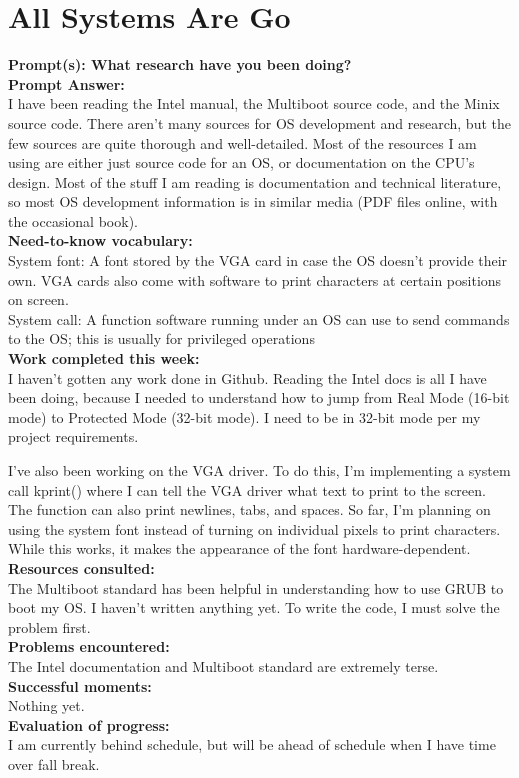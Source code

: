 \documentclass[11pt]{article}
\begin{document}
\section{All Systems Are Go}
\textbf{Prompt(s): What research have you been doing?}\\
\textbf{Prompt Answer:}\\
I have been reading the Intel manual, the Multiboot source code, and the Minix source code. There aren't many sources for OS development and research, but the few sources are quite thorough and well-detailed. Most of the resources I am using are either just source code for an OS, or documentation on the CPU's design. Most of the stuff I am reading is documentation and technical literature, so most OS development information is in similar media (PDF files online, with the occasional book).\\
\textbf{Need-to-know vocabulary:}\\
System font: A font stored by the VGA card in case the OS doesn't provide their own. VGA cards also come with software to print characters at certain positions on screen.\\
System call: A function software running under an OS can use to send commands to the OS; this is usually for privileged operations\\
\textbf{Work completed this week:}\\
I haven't gotten any work done in Github. Reading the Intel docs is all I have been doing, because I needed to understand how to jump from Real Mode (16-bit mode) to Protected Mode (32-bit mode). I need to be in 32-bit mode per my project requirements.

I've also been working on the VGA driver. To do this, I'm implementing a system call kprint() where I can tell the VGA driver what text to print to the screen. The function can also print newlines, tabs, and spaces. So far, I'm planning on using the system font instead of turning on individual pixels to print characters. While this works, it makes the appearance of the font hardware-dependent.\\
\textbf{Resources consulted:}\\
The Multiboot standard has been helpful in understanding how to use GRUB to boot my OS. I haven't written anything yet. To write the code, I must solve the problem first.\\
\textbf{Problems encountered:}\\
The Intel documentation and Multiboot standard are extremely terse.\\
\textbf{Successful moments:}\\
Nothing yet.\\
\textbf{Evaluation of progress:}\\
I am currently behind schedule, but will be ahead of schedule when I have time over fall break.
\end{document}
